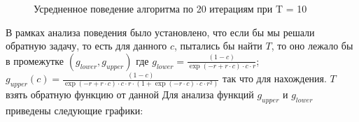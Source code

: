 \documentclass[times]{itmo-student-thesis}
\begin{document}
    \begin{figure}[h]
        \begin{minipage}[h]{0.49\linewidth}
        \end{minipage}
        \hfill
        \begin{minipage}[h]{0.49\linewidth}
        \end{minipage}
        \caption{Усредненное поведение алгоритма по 20 итерациям при T = 10}
        \label{ris:image1}
    \end{figure}
    \newpage
    В рамках анализа поведения было установлено, что если бы мы решали обратную задачу, то есть для данного $c$, пытались бы найти $T$, то оно лежало бы в промежутке $(g_{lower}, g_{upper})$  где $g_{lower}= \frac{(1 - c)}{\exp(-r + r\cdot c) \cdot c \cdot r}$; $g_{upper}(c) = \frac{(1 - c)}{\exp(-r + r\cdot c) \cdot c \cdot r \cdot (1 + \exp(-r\cdot c) \cdot c \cdot r^2)}$ так что для нахождения. $T$ взять обратную функцию от данной
    Для анализа функций $g_{upper}$ и $g_{lower}$ приведены следующие графики:
\end{document}
